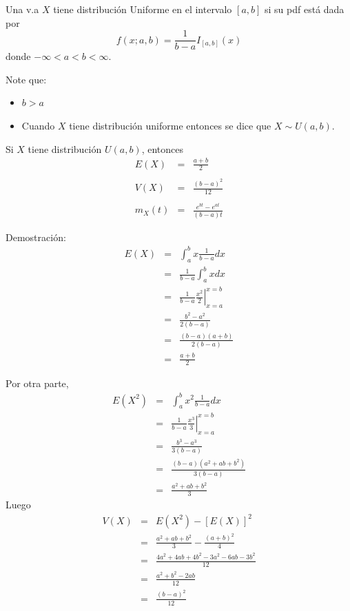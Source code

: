 \begin{i}
\begin{definition}
Una v.a $X$ tiene distribución Uniforme en el intervalo $[a,b]$ si su pdf está dada por 
\begin{equation*}
f(x;a,b)=\frac{1}{b-a}I_{[a,b]}(x)
\end{equation*}%
donde $-\infty <a<b<\infty$.
\end{definition}

Note que:
\begin{itemize}
\item $b>a$

\item Cuando $X$ tiene distribución uniforme entonces se dice que $X\sim
U(a,b)$.
\end{itemize}


\begin{theorem}
 Si $X$ tiene distribución $U(a,b)$, entonces
\begin{eqnarray*}
E(X) &=&\frac{a+b}{2} \\
&& \\
V(X) &=&\frac{(b-a)^{2}}{12} \\
&& \\
m_{X}(t) &=&\frac{e^{bt}-e^{at}}{(b-a)t}
\end{eqnarray*}
\end{theorem} 

Demostración: 
\begin{eqnarray*}
E(X) &=&\int_{a}^{b}x\frac{1}{b-a}dx \\
&=&\frac{1}{b-a}\int_{a}^{b}xdx \\
&=&\frac{1}{b-a}\left. \frac{x^{2}}{2}\right\vert _{x=a}^{x=b} \\
&=&\frac{b^{2}-a^{2}}{2(b-a)} \\
&=&\frac{\left( b-a\right) \left( a+b\right) }{2(b-a)} \\
&=&\frac{a+b}{2}
\end{eqnarray*}

Por otra parte, 
\begin{eqnarray*}
E(X^{2}) &=&\int_{a}^{b}x^{2}\frac{1}{b-a}dx \\
&=&\frac{1}{b-a}\left. \frac{x^{3}}{3}\right\vert _{x=a}^{x=b} \\
&=&\frac{b^{3}-a^{3}}{3(b-a)} \\
&=&\frac{(b-a)(a^{2}+ab+b^{2})}{3(b-a)} \\
&=&\frac{a^{2}+ab+b^{2}}{3}
\end{eqnarray*}%
Luego 
\begin{eqnarray*}
V(X) &=&E(X^{2})-\left[ E(X)\right] ^{2} \\
&=&\frac{a^{2}+ab+b^{2}}{3}-\frac{\left( a+b\right) ^{2}}{4} \\
&=&\frac{4a^{2}+4ab+4b^{2}-3a^{2}-6ab-3b^{2}}{12} \\
&=&\frac{a^{2}+b^{2}-2ab}{12} \\
&=&\frac{(b-a)^{2}}{12}
\end{eqnarray*}


\end{i}
